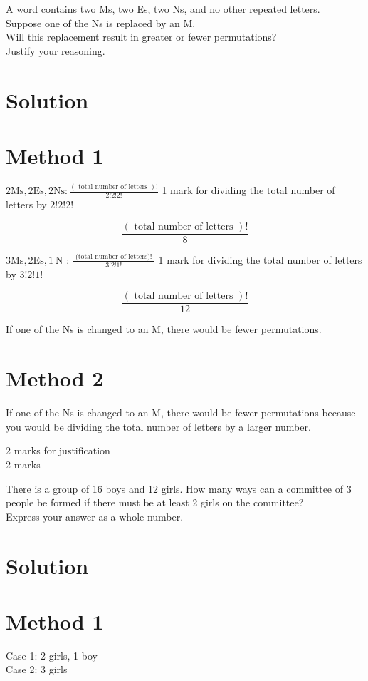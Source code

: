 \documentclass[10pt]{article}
\begin{document}
A word contains two Ms, two Es, two Ns, and no other repeated letters.\\
Suppose one of the Ns is replaced by an M.\\
Will this replacement result in greater or fewer permutations?\\
Justify your reasoning.

\section*{Solution}
\section*{Method 1}
$2 \mathrm{Ms}, 2 \mathrm{Es}, 2 \mathrm{Ns}: \frac{(\text { total number of letters })!}{2!2!2!}$ 1 mark for dividing the total number of letters by $2!2!2!$

$$
\frac{(\text { total number of letters })!}{8}
$$

$3 \mathrm{Ms}, 2 \mathrm{Es}, 1 \mathrm{~N}$ : $\frac{\text { (total number of letters)! }}{3!2!1!}$ 1 mark for dividing the total number of letters by $3!2!1!$

$$
\frac{(\text { total number of letters })!}{12}
$$

If one of the Ns is changed to an M, there would be fewer permutations.

\section*{Method 2}
If one of the Ns is changed to an M, there would be fewer permutations because you would be dividing the total number of letters by a larger number.

2 marks for justification\\
2 marks

There is a group of 16 boys and 12 girls. How many ways can a committee of 3 people be formed if there must be at least 2 girls on the committee?\\
Express your answer as a whole number.

\section*{Solution}
\section*{Method 1}
Case 1: 2 girls, 1 boy\\
Case 2: 3 girls
\end{document}
